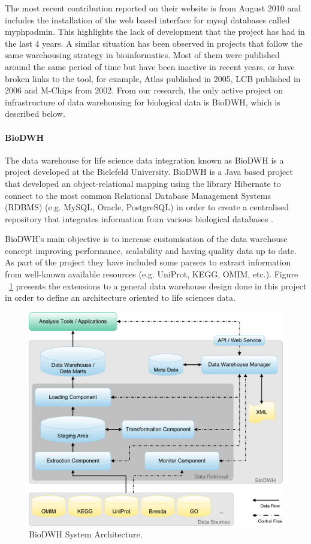 The most recent contribution reported on their website is from August 2010 and includes the installation of the web based interface for mysql databases called myphpadmin. This highlights the lack of development that the project has had in the last 4 years. A similar situation has been observed in projects that follow the same warehousing strategy in bioinformatics. Most of them were published around the same period of time but have been inactive in recent years, or have broken links to the tool, for example, Atlas \cite{SHA2005} published in 2005, LCB\cite{AME2006} published in 2006 and M-Chips \cite{FEL2002} from 2002. From our research, the only active project on infrastructure of data warehousing for biological data is BioDWH, which is described below.

\paragraph{BioDWH}
The data warehouse for life science data integration known as BioDWH is a project developed at the Bielefeld University. BioDWH is a Java based project that developed an object-relational mapping using the library Hibernate to connect to the most common Relational Database Management Systems (RDBMS) (e.g. MySQL, Oracle, PostgreSQL) in order to create a centralised repository that integrates information from various biological databases \cite{TOP2008}.

BioDWH's main objective is to increase customisation of the data warehouse concept improving performance, scalability and having quality data up to date. As part of the project they have included some parsers to extract information from well-known available resources (e.g. UniProt, KEGG, OMIM, etc.). Figure ~\ref{fig:biodwh} presents the extensions to a general data warehouse design done in this project in order to define an architecture oriented to life sciences data.

\begin{figure}  
\centering
\includegraphics[width=4.5in]{figures/dwh_architecture.png}
\caption[BioDWH System Architecture.]{BioDWH System Architecture.
\label{fig:biodwh}}
\end{figure}

